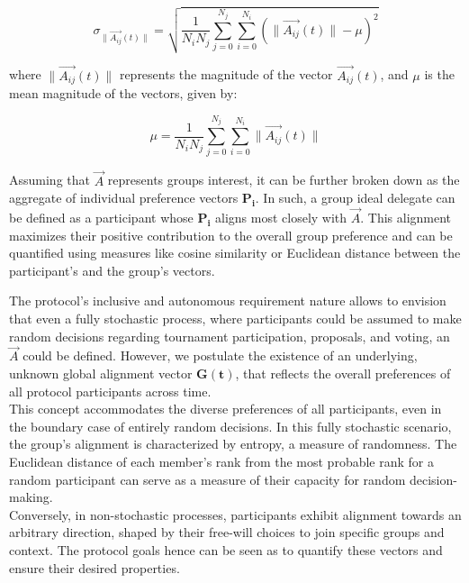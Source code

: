 \documentclass{article}
\begin{document}
\begin{CJK}{UTF8}{gbsn}
\begin{multicols}{2}
        \begin{equation}
            \sigma_{\|\vec{A_{ij}}(t)\|} = \sqrt{\frac{1}{N_{i}N_{j}} \sum_{j=0}^{N_{j}} \sum_{i=0}^{N_{i}} \left( \|\vec{A_{ij}}(t)\| - \mu \right)^2}
        \end{equation}

        where $\|\vec{A_{ij}}(t)\|$ represents the magnitude of the vector $\vec{A_{ij}}(t)$, and $\mu$ is the mean magnitude of the vectors, given by:

        \begin{equation}
            \mu = \frac{1}{N_{i}N_{j}} \sum_{j=0}^{N_{j}} \sum_{i=0}^{N_{i}} \|\vec{A_{ij}}(t)\|
        \end{equation}

        Assuming that $\vec{A}$ represents groups interest, it can be further broken down as the aggregate of individual preference vectors $\mathbf{P_i}$. In such, a group ideal delegate can be defined as a participant whose $\mathbf{P_i}$ aligns most closely with $\vec{A}$.
        This alignment maximizes their positive contribution to the overall group preference and can be quantified using measures like cosine similarity or Euclidean distance between the participant's and the group's vectors.

        The protocol's inclusive and autonomous requirement nature allows to envision that even a fully stochastic process, where participants could be assumed to make random decisions regarding tournament participation, proposals, and voting, an $\vec{A}$ could be defined.
        However, we postulate the existence of an underlying, unknown global alignment vector $\mathbf{G(t)}$, that reflects the overall preferences of all protocol participants across time. \\
        This concept accommodates the diverse preferences of all participants, even in the boundary case of entirely random decisions.
        In this fully stochastic scenario, the group's alignment is characterized by entropy, a measure of randomness. The Euclidean distance of each member's rank from the most probable rank for a random participant can serve as a measure of their capacity for random decision-making. \\
        Conversely, in non-stochastic processes, participants exhibit alignment towards an arbitrary direction, shaped by their free-will choices to join specific groups and context. The protocol goals hence can be seen as to quantify these vectors and ensure their desired properties.



\end{multicols}
\end{CJK}
\end{document}
